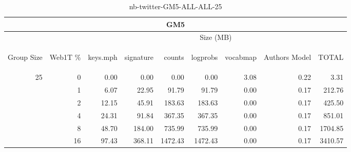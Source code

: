 \begin{center}
\begin{table}[htbp]
\begin{tabular}{ | r | r | r | r | r | r | r | r | r |}
\hline
\multicolumn{9}{|c|}{GM5}\\
\hline
 & & \multicolumn{7}{|c|}{Size (MB)}\\ \cline{3-9}
\begin{sideways}Group Size\end{sideways} & \begin{sideways}Web1T \% \end{sideways} & \begin{sideways}keys.mph\end{sideways} & \begin{sideways}signature\end{sideways} & \begin{sideways}counts\end{sideways} & \begin{sideways}logprobs\end{sideways} & \begin{sideways}vocabmap\end{sideways} & \begin{sideways}Authors Model \end{sideways} & \begin{sideways}TOTAL\end{sideways}\\
\hline
\multirow{5}{*}{25}
 & 0 & 0.00 & 0.00 & 0.00 & 0.00 & 3.08 & 0.22 & 3.31\\ \cline{2-9}
 & 1 & 6.07 & 22.95 & 91.79 & 91.79 & 0.00 & 0.17 & 212.76\\ \cline{2-9}
 & 2 & 12.15 & 45.91 & 183.63 & 183.63 & 0.00 & 0.17 & 425.50\\ \cline{2-9}
 & 4 & 24.31 & 91.84 & 367.35 & 367.35 & 0.00 & 0.17 & 851.01\\ \cline{2-9}
 & 8 & 48.70 & 184.00 & 735.99 & 735.99 & 0.00 & 0.17 & 1704.85\\ \cline{2-9}
 & 16 & 97.43 & 368.11 & 1472.43 & 1472.43 & 0.00 & 0.17 & 3410.57\\ \cline{2-9}
\hline
\end{tabular}
\caption{nb-twitter-GM5-ALL-ALL-25}
\label{table:nb-twitter-GM5-ALL-ALL-25}
\end{table}
\end{center}

